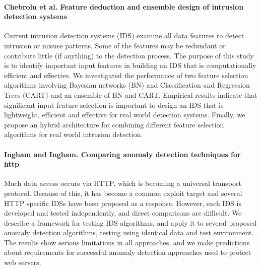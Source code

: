 \paragraph*{Chebrolu et al. Feature deduction and ensemble design of intrusion detection systems}
\cite{chebrolu2005feature}
Current intrusion detection systems (IDS) examine all data features to detect intrusion or misuse patterns. Some of the features may be redundant or contribute little (if anything) to the detection process. The purpose of this study is to identify important input features in building an IDS that is computationally efficient and effective. We investigated the performance of two feature selection algorithms involving Bayesian networks (BN) and Classification and Regression Trees (CART) and an ensemble of BN and CART. Empirical results indicate that significant input feature selection is important to design an IDS that is lightweight, efficient and effective for real world detection systems. Finally, we propose an hybrid architecture for combining different feature selection algorithms for real world intrusion detection.

\paragraph*{Ingham and Ingham. Comparing anomaly detection techniques for http}
\cite{ingham2007comparing}
Much data access occurs via HTTP, which is becoming a universal transport protocol. Because of this, it has become a common exploit target and several HTTP specific IDSs have been proposed as a response. However, each IDS is developed and tested independently, and direct comparisons are difficult. We describe a framework for testing IDS algorithms, and apply it to several proposed anomaly detection algorithms, testing using identical data and test environment. The results show serious limitations in all approaches, and we make predictions about requirements for successful anomaly detection approaches used to protect web servers.

